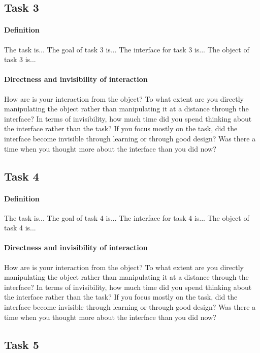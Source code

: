 \subsection{Task 3}

\paragraph{Definition}
The task is... The goal of task 3 is... The interface for task 3 is... The object of task 3 is...

\paragraph{Directness and invisibility of interaction}
How are is your interaction from the object? To what extent are you directly manipulating the object rather than manipulating it at a distance through the interface? In terms of invisibility, how much time did you spend thinking about the interface rather than the task? If you focus mostly on the task, did the interface become invisible through learning or through good design? Was there a time when you thought more about the interface than you did now?

\subsection{Task 4}

\paragraph{Definition}
The task is... The goal of task 4 is... The interface for task 4 is... The object of task 4 is...

\paragraph{Directness and invisibility of interaction}
How are is your interaction from the object? To what extent are you directly manipulating the object rather than manipulating it at a distance through the interface? In terms of invisibility, how much time did you spend thinking about the interface rather than the task? If you focus mostly on the task, did the interface become invisible through learning or through good design? Was there a time when you thought more about the interface than you did now?

\subsection{Task 5}

